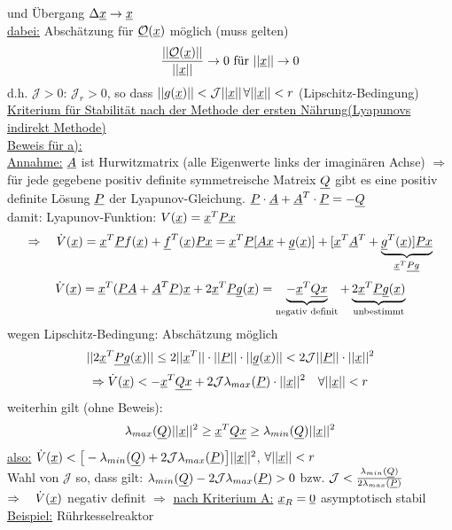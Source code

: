 \documentclass[openany,a4paper,11pt]{book}
\begin{document}
und Übergang $\Delta\uline{x}\rightarrow\uline{x}$\\
\uline{dabei:} Abschätzung für $\uline{\mathcal{O}}(\uline{x})$ möglich (muss gelten)
\[\frac{||\uline{\mathcal{O}}(\uline{x})||}{||\uline{x}||}\rightarrow0 \text{ für } ||\uline{x}||\rightarrow 0\]
d.h. $\mathcal{J}>0$: $\mathcal{J}_r>0$, so dass $||g(\uline{x})||<\mathcal{J}||\uline{x}||$\quad  $\forall ||\uline{x}||<r$ (Lipschitz-Bedingung)\\
\uline{Kriterium für Stabilität nach der Methode der ersten Nährung(Lyapunovs indirekt Methode)} \\
\uline{Beweis für a):}\\
\uline{Annahme:} $\uline{A}$ ist Hurwitzmatrix (alle Eigenwerte links der imaginären Achse) $\Rightarrow$ für jede gegebene positiv definite symmetreische Matreix $\uline{Q}$ gibt es eine positiv definite Lösung $\uline{P}$ der Lyapunov-Gleichung. $\uline{P}\cdot \uline{A}+\uline{A}^T\cdot \uline{P}=-\uline{Q}$\\
damit: Lyapunov-Funktion: $V(\uline{x})=\uline{x}^T\uline{P}\uline{x}$ \[\Rightarrow \quad \dot{V}(\uline{x})=\uline{x}^T\uline{P}f(\uline{x})+\uline{f}^T(\uline{x})\uline{Px}=\uline{x}^T\uline{P}[\uline{Ax}+\uline{g}(\uline{x})]+[\uline{x}^T\uline{A}^T+\underbrace{\uline{g}^T(\uline{x})]\uline{Px}}_{\uline{x}^T\uline{Pg}}\]
\[\dot{V}(\uline{x})=\uline{x}^T(\uline{PA}+\uline{A}^T\uline{P})\uline{x}+2\uline{x}^T\uline{P}\uline{g}(\uline{x})=\underbrace{-\uline{x}^T\uline{Qx}}_{\text{negativ definit}}+\underbrace{2\uline{x}^T\uline{P}\uline{g}(\uline{x})}_{\text{unbestimmt}}\]
wegen Lipschitz-Bedingung: Abschätzung möglich
\[||2\uline{x}^T\uline{Pg}(\uline{x})|| \le 2||\uline{x}^T||\cdot ||\uline{P}||\cdot ||\uline{g}(\uline{x})||<2\mathcal{J}||\uline{P}||\cdot ||\uline{x}||^2\]
\[\Rightarrow \dot{V}(\uline{x})<-\uline{x}^T\uline{Qx}+2\mathcal{J}\lambda_{max}(\uline{P})\cdot ||\uline{x}||^2 \quad \forall ||\uline{x}||<r\]
weiterhin gilt (ohne Beweis):
\[\lambda_{max}(\uline{Q})||\uline{x}||^2\ge\uline{x}^T\uline{Qx}\ge\lambda_{min}(\uline{Q})||\uline{x}||^2\]
\uline{also:} $\dot{V}(\uline{x})<\big[-\lambda_{min}(\uline{Q})+2\mathcal{J}\lambda_{max}(\uline{P})\big]||\uline{x}||^2$, $\forall ||\uline{x}||<r$\\
Wahl von $\mathcal{J}$ so, dass gilt: $\lambda_{min}(\uline{Q})-2\mathcal{J}\lambda_{max}(\uline{P})>0$ bzw. $\mathcal{J}<\frac{\lambda_{min}(\uline{Q})}{2\lambda_{max}(\uline{P})}$ \\
$\Rightarrow \quad \dot{V}(\uline{x})$ negativ definit $\Rightarrow$ \uline{nach Kriterium A:} $\uline{x}_R=\uline{0}$ asymptotisch stabil\\
\uline{Beispiel:} Rührkesselreaktor 
\end{document}
